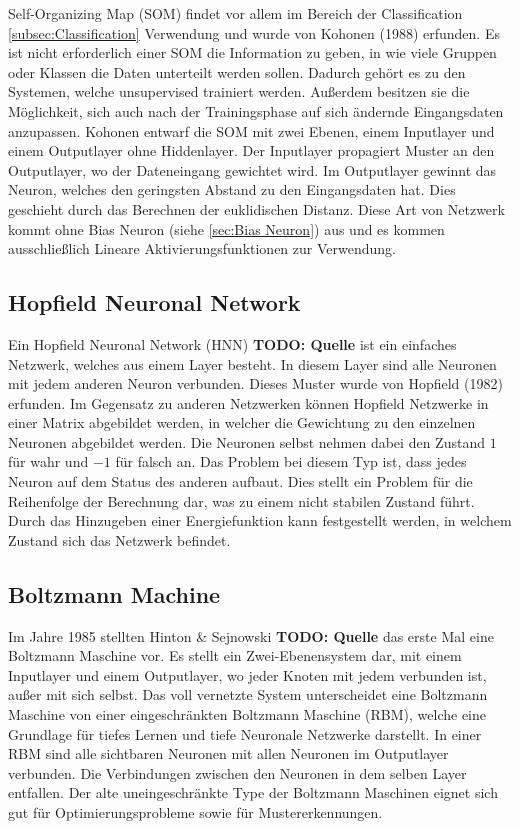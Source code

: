 Self-Organizing Map (SOM) findet vor allem im Bereich der Classification \ref{subsec:Classification} Verwendung und wurde von Kohonen (1988) erfunden. 
Es ist nicht erforderlich einer SOM die Information zu geben, in wie viele Gruppen oder Klassen die Daten unterteilt werden sollen. 
Dadurch gehört es zu den Systemen, welche unsupervised trainiert werden. 
Außerdem besitzen sie die Möglichkeit, sich auch nach der Trainingsphase auf sich ändernde Eingangsdaten anzupassen. 
Kohonen entwarf die SOM mit zwei Ebenen, einem Inputlayer und einem Outputlayer ohne Hiddenlayer. 
Der Inputlayer propagiert Muster an den Outputlayer, wo der Dateneingang gewichtet wird. 
Im Outputlayer gewinnt das Neuron, welches den geringsten Abstand zu den Eingangsdaten hat.
Dies geschieht durch das Berechnen der euklidischen Distanz. 
Diese Art von Netzwerk kommt ohne Bias Neuron (siehe \ref{sec:Bias Neuron}) aus und es kommen ausschließlich Lineare Aktivierungsfunktionen zur Verwendung.


\subsection{Hopfield Neuronal Network}

Ein Hopfield Neuronal Network (HNN) \textbf{TODO: Quelle} ist ein einfaches Netzwerk, welches aus einem Layer besteht. 
In diesem Layer sind alle Neuronen mit jedem anderen Neuron verbunden. 
Dieses Muster wurde von Hopfield (1982) erfunden. 
Im Gegensatz zu anderen Netzwerken können Hopfield Netzwerke in einer Matrix abgebildet werden, in welcher die Gewichtung zu den einzelnen Neuronen abgebildet werden. 
Die Neuronen selbst nehmen dabei den Zustand $1$ für wahr und $-1$ für falsch an.
Das Problem bei diesem Typ ist, dass jedes Neuron auf dem Status des anderen aufbaut.
Dies stellt ein Problem für die Reihenfolge der Berechnung dar, was zu einem nicht stabilen Zustand führt.
Durch das Hinzugeben einer Energiefunktion kann festgestellt werden, in welchem Zustand sich das Netzwerk befindet.

\subsection{Boltzmann Machine}

Im Jahre 1985 stellten Hinton \& Sejnowski \textbf{TODO: Quelle} das erste Mal eine Boltzmann Maschine vor.
Es stellt ein Zwei-Ebenensystem dar, mit einem Inputlayer und einem Outputlayer, wo jeder Knoten mit jedem verbunden ist, außer mit sich selbst.
Das voll vernetzte System unterscheidet eine Boltzmann Maschine von einer eingeschränkten Boltzmann Maschine (RBM), welche eine Grundlage für tiefes Lernen und tiefe Neuronale Netzwerke darstellt.
In einer RBM sind alle sichtbaren Neuronen mit allen Neuronen im Outputlayer verbunden. 
Die Verbindungen zwischen den Neuronen in dem selben Layer entfallen.
Der alte uneingeschränkte Type der Boltzmann Maschinen eignet sich gut für Optimierungsprobleme sowie für Mustererkennungen.

